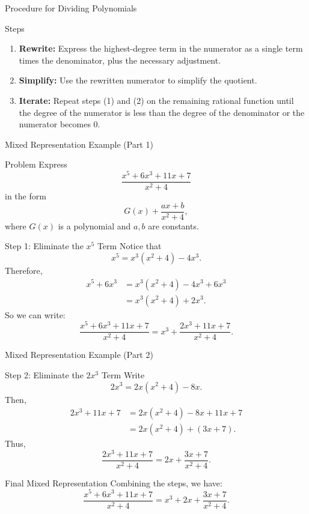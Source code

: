 \begin{frame}{Procedure for Dividing Polynomials}
  \begin{block}{Steps}
    \begin{enumerate}
      \item \textbf{Rewrite:} Express the highest-degree term in the numerator as a single term times the denominator, plus the necessary adjustment.
      \item \textbf{Simplify:} Use the rewritten numerator to simplify the quotient.
      \item \textbf{Iterate:} Repeat steps (1) and (2) on the remaining rational function until the degree of the numerator is less than the degree of the denominator or the numerator becomes 0.
    \end{enumerate}
  \end{block}
\end{frame}

\begin{frame}{Mixed Representation Example (Part 1)}
  \begin{exampleblock}{Problem}
    Express
    \[
      \frac{x^5+6x^3+11x+7}{x^2+4}
    \]
    in the form
    \[
      G(x)+\frac{ax+b}{x^2+4},
    \]
    where \(G(x)\) is a polynomial and \(a, b\) are constants.
  \end{exampleblock}
\end{frame}
\begin{frame}
  \begin{block}{Step 1: Eliminate the \(x^5\) Term}
    Notice that
    \[
      x^5=x^3(x^2+4)-4x^3.
    \]
    Therefore,
    \[
    \begin{aligned}
      x^5+6x^3 &= x^3(x^2+4)-4x^3+6x^3\\[1mm]
               &= x^3(x^2+4)+2x^3.
    \end{aligned}
    \]
    So we can write:
    \[
      \frac{x^5+6x^3+11x+7}{x^2+4}=x^3+\frac{2x^3+11x+7}{x^2+4}.
    \]
  \end{block}
\end{frame}

\begin{frame}{Mixed Representation Example (Part 2)}
  \begin{block}{Step 2: Eliminate the \(2x^3\) Term}
    Write
    \[
      2x^3=2x(x^2+4)-8x.
    \]
    Then,
    \[
    \begin{aligned}
      2x^3+11x+7 &= 2x(x^2+4)-8x+11x+7\\[1mm]
                  &= 2x(x^2+4)+(3x+7).
    \end{aligned}
    \]
    Thus,
    \[
      \frac{2x^3+11x+7}{x^2+4}=2x+\frac{3x+7}{x^2+4}.
    \]
  \end{block}
\end{frame} 
\begin{frame}
  \begin{block}{Final Mixed Representation}
    Combining the steps, we have:
    \[
      \frac{x^5+6x^3+11x+7}{x^2+4}=x^3+2x+\frac{3x+7}{x^2+4}.
    \]
  \end{block}
\end{frame}

